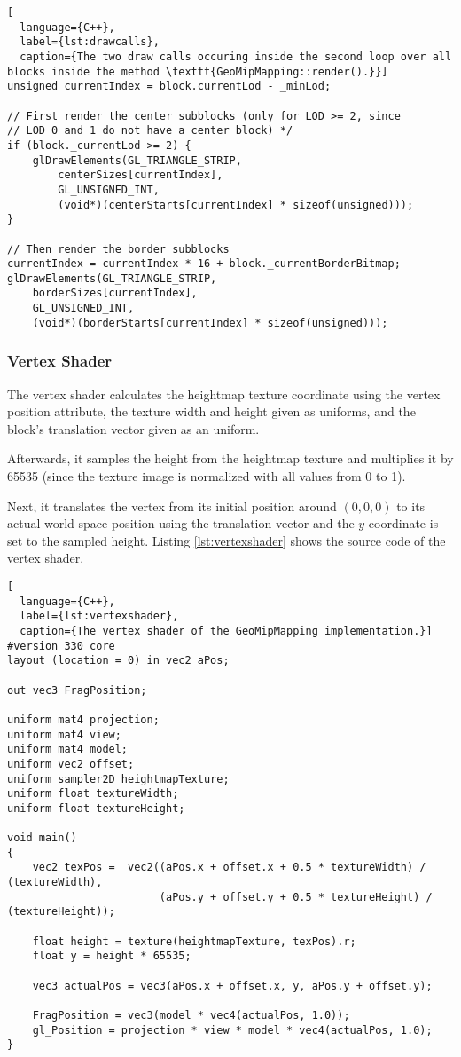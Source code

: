 \begin{lstlisting}[
  language={C++},
  label={lst:drawcalls},
  caption={The two draw calls occuring inside the second loop over all blocks inside the method \texttt{GeoMipMapping::render().}}]
unsigned currentIndex = block.currentLod - _minLod;

// First render the center subblocks (only for LOD >= 2, since
// LOD 0 and 1 do not have a center block) */
if (block._currentLod >= 2) {
    glDrawElements(GL_TRIANGLE_STRIP,
        centerSizes[currentIndex],
        GL_UNSIGNED_INT,
        (void*)(centerStarts[currentIndex] * sizeof(unsigned)));
}

// Then render the border subblocks
currentIndex = currentIndex * 16 + block._currentBorderBitmap;
glDrawElements(GL_TRIANGLE_STRIP,
    borderSizes[currentIndex],
    GL_UNSIGNED_INT,
    (void*)(borderStarts[currentIndex] * sizeof(unsigned)));
\end{lstlisting}

\subsubsection{Vertex Shader}
The vertex shader calculates the heightmap texture coordinate 
using the vertex position attribute, the texture width and height given as uniforms, 
and the block's translation vector given as an uniform.

Afterwards, it samples the height from the heightmap texture 
and multiplies it by 65535 (since the texture image is normalized with all values from 0 to 1).

Next, it translates the vertex from its initial position around $(0,0,0)$ to its actual world-space 
position using the translation vector and the $y$-coordinate is set to the sampled height.
Listing \ref{lst:vertexshader} shows the source code of the vertex shader.

\begin{lstlisting}[
  language={C++},
  label={lst:vertexshader},
  caption={The vertex shader of the GeoMipMapping implementation.}]
#version 330 core
layout (location = 0) in vec2 aPos;

out vec3 FragPosition;

uniform mat4 projection;
uniform mat4 view;
uniform mat4 model;
uniform vec2 offset;
uniform sampler2D heightmapTexture;
uniform float textureWidth;
uniform float textureHeight;

void main()
{
    vec2 texPos =  vec2((aPos.x + offset.x + 0.5 * textureWidth) / (textureWidth),
                        (aPos.y + offset.y + 0.5 * textureHeight) / (textureHeight));

    float height = texture(heightmapTexture, texPos).r;
    float y = height * 65535;

    vec3 actualPos = vec3(aPos.x + offset.x, y, aPos.y + offset.y);

    FragPosition = vec3(model * vec4(actualPos, 1.0));
    gl_Position = projection * view * model * vec4(actualPos, 1.0);
}
\end{lstlisting}

